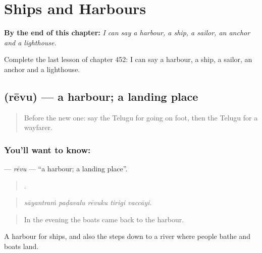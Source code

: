 
\chapter{Ships and Harbours}
\label{ch:te-ships-and-harbours}

\begin{chapteropening}
\textbf{By the end of this chapter:} \emph{I can say a harbour, a ship, a sailor, an anchor and a lighthouse.}

Complete the last lesson of chapter 452: I can say a harbour, a ship, a sailor, an anchor and a lighthouse.
\end{chapteropening}

\section[\texorpdfstring{\te{రేవు} (rēvu)}{రేవు (rēvu)}]{ (rēvu) — a harbour; a landing place}

\label{lesson:TE-C452-revu}



\begin{quote}
Before the new one: say the Telugu for going on foot, then the Telugu for a wayfarer.
\end{quote}

\subsection*{You'll want to know: }
\textbf{} — \emph{rēvu} — \textquotedblleft{}a harbour; a landing place\textquotedblright{}.

\begin{quote}
    .
\end{quote}

\begin{quote}
\emph{sāyantraṁ paḍavalu rēvuku tirigi vaccāyi.}
\end{quote}

\begin{quote}
In the evening the boats came back to the harbour.
\end{quote}

A harbour for ships, and also the steps down to a river where people bathe and boats land.

